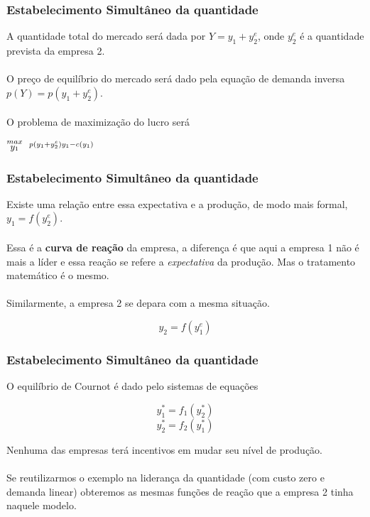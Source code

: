 \documentclass{beamer}[10]
\begin{document}
\begin{frame}
	\frametitle{Estabelecimento Simultâneo da quantidade}

	A quantidade total do mercado será dada por $Y = y_1 + y_2^e$, onde $y_2^e$ é a quantidade prevista da empresa 2. 
	\\~\\
	O preço de equilíbrio do mercado será dado pela equação de demanda inversa $p(Y) = p(y_1 + y_2^e)$.
	\\~\\
	O problema de maximização do lucro será

	\begin{center}
		\LARGE $\stackrel{max}{\text{\small $y_1$}} \ \ \stackrel{p(y_1 + y_2^e)y_1 - c(y_1)}{\ }$ \\
	\end{center}

\end{frame}

\begin{frame}
	\frametitle{Estabelecimento Simultâneo da quantidade}

	Existe uma relação entre essa expectativa e a produção, de modo mais formal, $y_1 = f(y_2^e)$.
	\\~\\
	Essa é a \textbf{curva de reação} da empresa, a diferença é que aqui a empresa 1 não é mais a líder e essa reação se refere a \textit{expectativa} da produção. Mas o tratamento matemático é o mesmo.
	\\~\\
	Similarmente, a empresa 2 se depara com a mesma situação.

	$$y_2 = f(y_1^e)$$

\end{frame}

\begin{frame}
	\frametitle{Estabelecimento Simultâneo da quantidade}

	O equilíbrio de Cournot é dado pelo sistemas de equações

	$$ y_1^* = f_1(y_2^*) $$
	$$ y_2^* = f_2(y_1^*) $$

	Nenhuma das empresas terá incentivos em mudar seu nível de produção.
	\\~\\
	Se reutilizarmos o exemplo na liderança da quantidade (com custo zero e demanda linear) obteremos as mesmas funções de reação que a empresa 2 tinha naquele modelo.

\end{frame}
\end{document}
